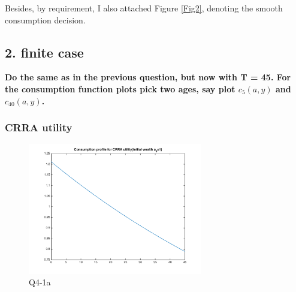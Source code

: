 \documentclass{article}[a4paper]
\begin{document}
Besides, by requirement, I also attached Figure \ref{Fig2}, denoting the smooth consumption decision. 

\medskip


\subsection{2. finite case}

\textbf{Do the same as in the previous question, but now with T = 45. For the consumption function plots pick two ages, say plot $c_5(a, y)$ and $c_{40}(a, y)$.}

\subsubsection*{CRRA utility}

\begin{figure}[htbp]
\centering
\includegraphics[width=0.68\textwidth]{img/41b.png}
\caption{Q4-1a} \label{fig41b}
\end{figure}
\end{document}
